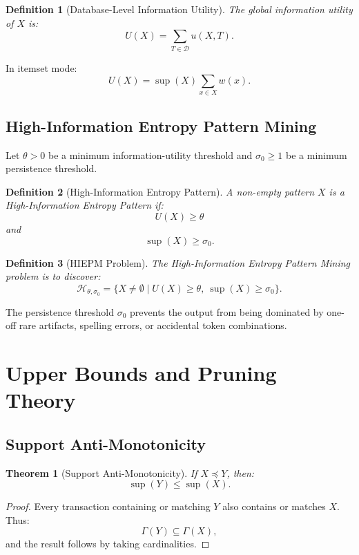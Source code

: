 \documentclass[11pt,a4paper]{article}
\newtheorem{definition}{Definition}
\newtheorem{theorem}{Theorem}
\newcommand{\D}{\mathcal{D}}
\newcommand{\HIEP}{\mathcal{H}}
\newcommand{\supp}{\operatorname{sup}}
\begin{document}
\begin{definition}[Database-Level Information Utility]
The global information utility of \(X\) is:
\[
U(X)=\sum_{T\in\D}u(X,T).
\]
\end{definition}

In itemset mode:
\[
U(X)=\supp(X)\sum_{x\in X}w(x).
\]

\subsection{High-Information Entropy Pattern Mining}

Let \(\theta>0\) be a minimum information-utility threshold and \(\sigma_0\ge1\) be a minimum persistence threshold.

\begin{definition}[High-Information Entropy Pattern]
A non-empty pattern \(X\) is a High-Information Entropy Pattern if:
\[
U(X)\ge\theta
\]
and
\[
\supp(X)\ge\sigma_0.
\]
\end{definition}

\begin{definition}[HIEPM Problem]
The High-Information Entropy Pattern Mining problem is to discover:
\[
\HIEP_{\theta,\sigma_0}
=
\{X\neq\emptyset\mid U(X)\ge\theta,\ \supp(X)\ge\sigma_0\}.
\]
\end{definition}

The persistence threshold \(\sigma_0\) prevents the output from being dominated by one-off rare artifacts, spelling errors, or accidental token combinations.

\section{Upper Bounds and Pruning Theory}

\subsection{Support Anti-Monotonicity}

\begin{theorem}[Support Anti-Monotonicity]
If \(X\preceq Y\), then:
\[
\supp(Y)\le\supp(X).
\]
\end{theorem}

\begin{proof}
Every transaction containing or matching \(Y\) also contains or matches \(X\). Thus:
\[
\Gamma(Y)\subseteq\Gamma(X),
\]
and the result follows by taking cardinalities.
\end{proof}
\end{document}
